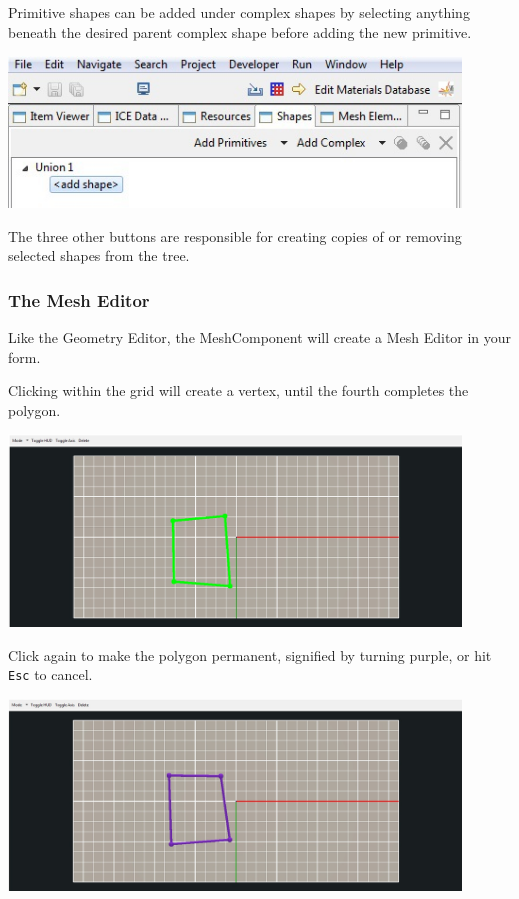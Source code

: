 \documentclass{article}
\begin{document}
Primitive shapes can be added under complex shapes by selecting anything beneath
the desired parent complex shape before adding the new primitive.

\begin{center}
\includegraphics[width=12cm]{images/ComplexShapeTree}
\end{center}

The three other buttons are responsible for creating copies of or removing
selected shapes from the tree. 


\subsubsection{The Mesh Editor}

Like the Geometry Editor, the MeshComponent will create a Mesh Editor in your
form.

Clicking within the grid will create a vertex, until the fourth completes the
polygon.

\begin{center}
\includegraphics[width=12cm]{images/AddPolygon}
\end{center}

Click again to make the polygon permanent, signified by turning purple, or hit
\texttt{Esc} to cancel.

\begin{center}
\includegraphics[width=12cm]{images/NewPolygon}
\end{center}
\end{document}
